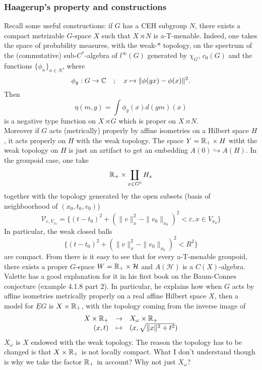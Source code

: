 \subsubsection*{Haagerup's property and constructions}
Recall some useful constructions: if $G$ has a CEH subgroup $N$, there exists a compact metrizable $G$-space $X$ such that $X\rtimes N$ is a-T-menable. Indeed, one takes the space of probability measures, with the weak-$*$ topology, on the spectrum of the (commutative) sub-$C^*$-algebra of $l^\infty (G)$ generated by $\chi_G$, $c_0(G)$ and the functions $\{\phi_n\}_{n\in N}$, where
\[\phi_g : G\rightarrow \mathbb C  \quad ;\quad x \mapsto \| \phi(gx) - \phi(x) \|^2. \] 
Then 
\[\eta (m,g) = \int \phi_g(x)d(gm)(x)\]
is a negative type function on $X\rtimes G$ which is proper on $X\rtimes N$.\\

Moreover if $G$ acts (metrically) properly by affine isometries on a Hilbert space $H$, it acts properly on $H$ with the weak topology. The space $Y = \mathbb R_+ \times H$ witht the weak topology on $H$ is just an artifact to get an embedding $A(0) \hookrightarrow A(H)$. In the groupoid case, one take
\[ \mathbb R_+ \times \coprod_{x\in G^0} H_x\]
together with the topology generated by the open subsets (basis of neighboorhood of $(x_0,t_0,v_0)$)
\[ \mathcal V_{\varepsilon, V_{x_0}} = \{ (t-t_0)^2 + (\| v\|_x^2 - \| v_0\|_{x_0} )^2 < \varepsilon , x\in V_{x_0}\} \]
In particular, the weak closed balls
\[  \{ (t-t_0)^2 + (\| v\|_x^2 - \| v_0\|_{x_0} )^2 < R^2 \}\]
are compact. From there is it easy to see that for every a-T-menable groupoid, there exists a proper $G$-space $W= \mathbb R_+\times \mathcal H$ and $A(\mathcal H)$ is a $C(X)$-algebra.\\

Valette has a good explanation for it in his first book on the Baum-Connes conjecture (example 4.1.8 part 2). In particular, he explains how when $G$ acts by affine isometries metrically properly on a real affine Hilbert space $X$, then a model for $\underline E G$ is $X\times \mathbb R_+$, with the topology coming from the inverse image of 
\[\begin{array}{rcl} X\times \mathbb R_+ & \rightarrow & X_\omega \times \mathbb R_+ \\ (x,t) & \mapsto & (x, \sqrt{\|x \|^2 + t^2})\end{array}\]  
$X_\omega$ is $X$ endowed with the weak topology. The reason the topology has to be changed is that $X\times \mathbb R_+$ is not locally compact. What I don't understand though is why we take the factor $\mathbb R_+$ in account? Why not just $X_\omega$?

